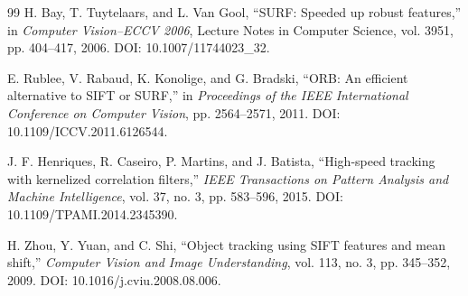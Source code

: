 \documentclass[12pt,a4paper]{article}
\numberwithin{equation}{section}
\begin{document}
\begin{thebibliography}{99}
H. Bay, T. Tuytelaars, and L. Van Gool, ``SURF: Speeded up robust features,'' in
\emph{Computer Vision--ECCV 2006}, Lecture Notes in Computer Science, vol. 3951,
pp. 404--417, 2006. DOI: 10.1007/11744023\_32.

E. Rublee, V. Rabaud, K. Konolige, and G. Bradski, ``ORB: An efficient alternative to SIFT or
SURF,'' in \emph{Proceedings of the IEEE International Conference on Computer Vision},
pp. 2564--2571, 2011. DOI: 10.1109/ICCV.2011.6126544.

J. F. Henriques, R. Caseiro, P. Martins, and J. Batista, ``High-speed tracking with kernelized
correlation filters,'' \emph{IEEE Transactions on Pattern Analysis and Machine Intelligence},
vol. 37, no. 3, pp. 583--596, 2015. DOI: 10.1109/TPAMI.2014.2345390.

H. Zhou, Y. Yuan, and C. Shi, ``Object tracking using SIFT features and mean shift,''
\emph{Computer Vision and Image Understanding}, vol. 113, no. 3, pp. 345--352, 2009.
DOI: 10.1016/j.cviu.2008.08.006.

\end{thebibliography}
\end{document}
